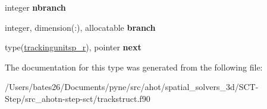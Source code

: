 \begin{DoxyCompactItemize}
\item 
\hypertarget{structtracking__data__structures_1_1trackingunitsp__r_a5378c801096551d6d507eb04dd011a6c}{integer {\bfseries nbranch}}\label{structtracking__data__structures_1_1trackingunitsp__r_a5378c801096551d6d507eb04dd011a6c}

\item 
\hypertarget{structtracking__data__structures_1_1trackingunitsp__r_a190f4625d2f13828b2f02ca184121c79}{integer, dimension(\+:), allocatable {\bfseries branch}}\label{structtracking__data__structures_1_1trackingunitsp__r_a190f4625d2f13828b2f02ca184121c79}

\item 
\hypertarget{structtracking__data__structures_1_1trackingunitsp__r_a24d8fb2d7521637baa6381200f4fd753}{type(\hyperlink{structtracking__data__structures_1_1trackingunitsp__r}{trackingunitsp\+\_\+r}), pointer {\bfseries next}}\label{structtracking__data__structures_1_1trackingunitsp__r_a24d8fb2d7521637baa6381200f4fd753}

\end{DoxyCompactItemize}


The documentation for this type was generated from the following file\+:\begin{DoxyCompactItemize}
\item 
/\+Users/bates26/\+Documents/pyne/src/ahot/spatial\+\_\+solvers\+\_\+3d/\+S\+C\+T-\/\+Step/src\+\_\+ahotn-\/step-\/sct/trackstruct.\+f90\end{DoxyCompactItemize}
